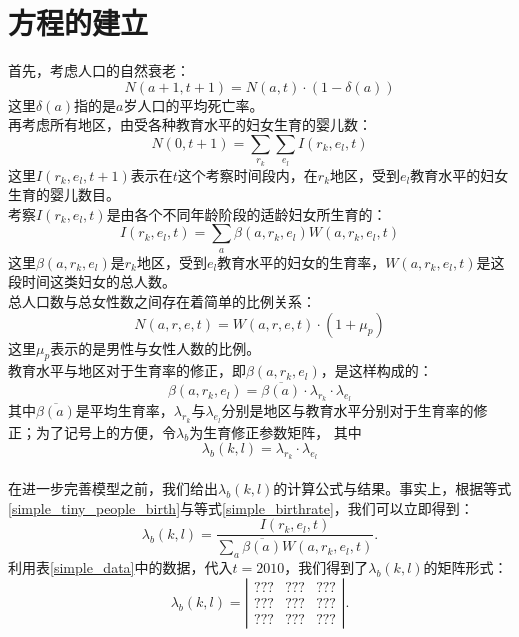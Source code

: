 \documentclass[11pt]{article}
\begin{document}
\section{方程的建立}
首先，考虑人口的自然衰老：
	\begin{equation}
		\label{simple_people_aging}
		N(a+1,t+1) = N(a,t) \cdot (1-\delta (a))
	\end{equation}
这里$\delta (a)$指的是$a$岁人口的平均死亡率。\\
\indent
再考虑所有地区，由受各种教育水平的妇女生育的婴儿数：
	\begin{equation}
		\label{simple_people_birth}
		N(0,t+1) = \sum_{r_k} \sum_{e_l} I(r_k, e_l, t)
	\end{equation}
这里$I(r_k, e_l, t+1)$表示在$t$这个考察时间段内，在$r_k$地区，受到$e_l$教育水平的妇女生育的婴儿数目。\\
\indent
考察$I(r_k, e_l, t)$是由各个不同年龄阶段的适龄妇女所生育的：
	\begin{equation}
		\label{simple_tiny_people_birth}
		I(r_k, e_l, t) = \sum_a \beta(a, r_k, e_l)W(a, r_k, e_l, t)
	\end{equation}
这里$\beta(a, r_k, e_l)$是$r_k$地区，受到$e_l$教育水平的妇女的生育率，$W(a, r_k, e_l, t)$是这段时间这类妇女的总人数。\\
\indent
总人口数与总女性数之间存在着简单的比例关系：
	\begin{equation}
		\label{simple_ratio_people_female}
		N(a,r,e,t) = W(a,r,e,t) \cdot (1+\mu_p)
	\end{equation}
这里$\mu_p$表示的是男性与女性人数的比例。\\
\indent
教育水平与地区对于生育率的修正，即$\beta(a, r_k, e_l)$，是这样构成的：
	\begin{equation}
		\label{simple_birthrate}
		\beta(a, r_k, e_l) = \overline{\beta(a)} \cdot \lambda_{r_k} \cdot \lambda_{e_l}
	\end{equation}
其中$\overline{\beta(a)}$是平均生育率，$\lambda_{r_k}$与$\lambda_{e_l}$分别是地区与教育水平分别对于生育率的修正；为了记号上的方便，令$\lambda_b$为生育修正参数矩阵， 其中
	\begin{equation}
		\label{simple_birthrate_factor}
		\lambda_b(k,l) = \lambda_{r_k} \cdot \lambda_{e_l}
	\end{equation}
\\
\indent
在进一步完善模型之前，我们给出$\lambda_b(k,l)$的计算公式与结果。事实上，根据等式\ref{simple_tiny_people_birth}与等式\ref{simple_birthrate}，我们可以立即得到：
	\begin{equation}
		\label{simple_lambda_b_calc}
		\lambda_b(k,l) = \frac{I(r_k, e_l, t)}{\sum_a \overline{\beta(a)} W(a, r_k, e_l, t)}.
	\end{equation}
利用表\ref{simple_data}中的数据，代入$t=2010$，我们得到了$\lambda_b(k,l)$的矩阵形式：
	\begin{equation}
		\label{simple_lambda_b}
		\lambda_b(k,l) = \left|
		\begin{array}{ccc}
			??? & ??? & ??? \\
			??? & ??? & ??? \\
			??? & ??? & ???
		\end{array} \right|.
	\end{equation}
\end{document}
